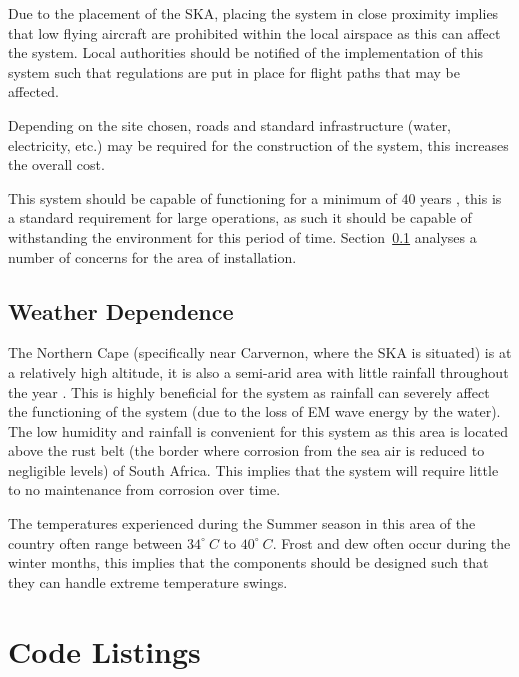 \documentclass[11pt]{witseiepaper}
\begin{document}
\begin{bibunit}[witseie]
Due to the placement of the SKA, placing the system in close proximity implies that low flying aircraft are prohibited within the local airspace as this can affect the system.
Local authorities should be notified of the implementation of this system such that regulations are put in place for flight paths that may be affected.

Depending on the site chosen, roads and standard infrastructure (water, electricity, etc.) may be required for the construction of the system, this increases the overall cost.

This system should be capable of functioning for a minimum of $40$ years \cite[p.~336]{AMISRCosting}, this is a standard requirement for large operations, as such it should be capable of withstanding the environment for this period of time. Section~\ref{sec:WeatherDependence} analyses a number of concerns for the area of installation.

\subsection{Weather Dependence} \label{sec:WeatherDependence}
The Northern Cape (specifically near Carvernon, where the SKA is situated) is at a relatively high altitude, it is also a semi-arid area with little rainfall throughout the year \cite{Rainfall}.
This is highly beneficial for the system as rainfall can severely affect the functioning of the system (due to the loss of EM wave energy by the water).
The low humidity and rainfall is convenient for this system as this area is located above the rust belt (the border where corrosion from the sea air is reduced to negligible levels) of South Africa. This implies that the system will require little to no maintenance from corrosion over time.

The temperatures experienced during the Summer season in this area of the country often range between $34^{\circ}~C$ to $40^{\circ}~C$. Frost and dew often occur during the winter months, this implies that the components should be designed such that they can handle extreme temperature swings.







\section{Code Listings} \label{sec:CodeListings}



\putbib[references]
\end{bibunit}
\end{document}
